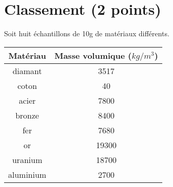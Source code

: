 \section{Classement (2 points)}\label{ex:classement}

Soit huit échantillons de 10g de matériaux différents.

{\small \begin{center}
	\begin{tabular}{|@{\ }c@{\ }|@{\ }c@{\ }|}
		\hline
		\textbf{Matériau}  & \textbf{Masse volumique ($kg/m^3$)} \\ \hline
		diamant   & \num{3517}                 \\ \hline
		coton     & \num{40}                   \\ \hline
		acier     & \num{7800}                 \\ \hline
		bronze    & \num{8400}                 \\ \hline
		fer       & \num{7680}                 \\ \hline
		or        & \num{19300}                \\ \hline
		uranium   & \num{18700}                \\ \hline
		aluminium & \num{2700}                 \\ \hline
	\end{tabular}
\end{center}}

